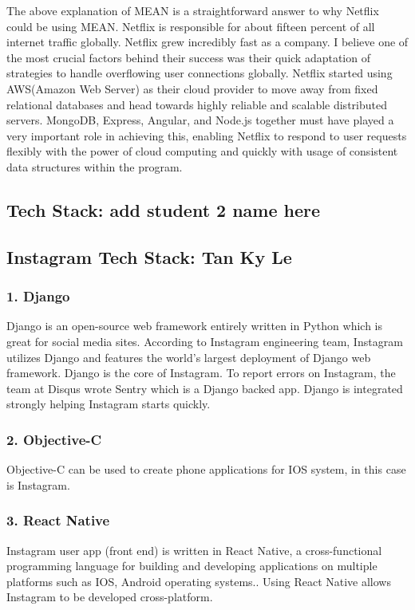 \documentclass[a4paper, 11pt]{report}
\begin{document}
The above explanation of MEAN is a straightforward answer to why Netflix could be using MEAN. Netflix is responsible for about fifteen percent of all internet traffic globally. Netflix grew incredibly fast as a company. I believe one of the most crucial factors behind their success was their quick adaptation of strategies to handle overflowing user connections globally. Netflix started using AWS(Amazon Web Server) as their cloud provider to move away from fixed relational databases and head towards highly reliable and scalable distributed servers.\cite{isaac11}  MongoDB, Express, Angular, and Node.js together must have played a very important role in achieving this, enabling Netflix to respond to user requests flexibly with the power of cloud computing and quickly with usage of consistent data structures within the program.


\subsection{Tech Stack: add student 2 name here}


\subsection{ Instagram Tech Stack: Tan Ky Le}
\subsubsection{1. Django}
 Django is an open-source web framework entirely written in Python which is great for social media sites. According to Instagram engineering team, Instagram utilizes Django and features the world’s largest deployment of Django web framework\cite{ky3}. Django is the core of Instagram. To report errors on Instagram, the team at Disqus wrote Sentry which is a Django backed app. Django is integrated strongly helping Instagram starts quickly\cite{ky4}. 
\subsubsection{2. Objective-C}
Objective-C can be used to create phone applications for IOS system, in this case is Instagram.
\subsubsection{3. React Native}
Instagram user app (front end) is written in React Native, a cross-functional programming language for building and developing applications on multiple platforms such as IOS, Android operating systems.\cite{ky7}. Using React Native allows Instagram to be developed cross-platform.
\end{document}
